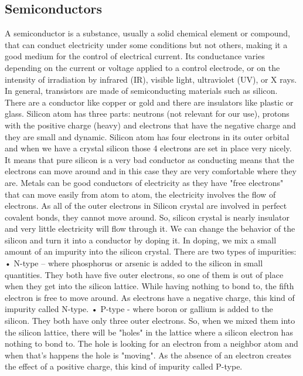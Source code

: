 \subsection{ Semiconductors }
A semiconductor is a substance, usually a solid chemical element or compound, that can conduct electricity under some conditions but not others, making it a good medium for the control of electrical current. Its conductance varies depending on the current or voltage applied to a control electrode, or on the intensity of irradiation by infrared (IR), visible light, ultraviolet (UV), or X rays.
In general, transistors are made of semiconducting materials such as silicon. There are a conductor like copper or gold and there are insulators like plastic or glass. 
Silicon atom has three parts: neutrons (not relevant for our use), protons with the positive charge (heavy) and electrons that have the negative charge and they are small and dynamic. Silicon atom has four electrons in its outer orbital and when we have a crystal silicon those 4 electrons are set in place very nicely. It means that pure silicon is a very bad conductor as  conducting means that the electrons can move around and in this case they are very comfortable where they are.
Metals can be good conductors of electricity as they have "free electrons" that can move easily from atom to atom, the electricity involves the flow of electrons. As all of the outer electrons in Silicon crystal are involved in perfect covalent bonds, they cannot move around. So, silicon crystal is nearly insulator and very little electricity will flow through it.
We can change the behavior of  the silicon and turn it into a conductor by doping it. In doping, we mix a small amount of an impurity into the silicon crystal.
\newline
There are two types of impurities:
\newline
•	N-type – where phosphorus or arsenic is added to the silicon in small quantities. They both have  five outer electrons, so one of them is out of place when they get into the silicon lattice. While having nothing to bond to, the fifth electron is free to move around. As electrons have a negative charge, this kind of impurity called N-type.
\newline
•	P-type - where boron or gallium is added to the silicon. They both have only three outer electrons. So, when we mixed them into the silicon lattice, there will be "holes" in the lattice where a silicon electron has nothing to bond to. The hole is looking for an electron from a neighbor atom and when that’s happens the hole is "moving". As the absence of an electron creates the effect of a positive charge, this kind of impurity called P-type.
